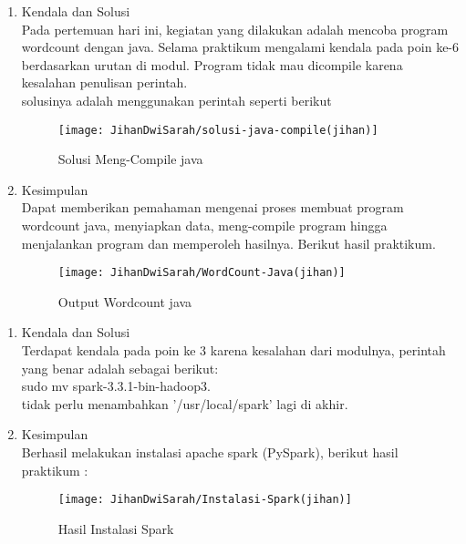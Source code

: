 \begin{enumerate}
\item Kendala dan Solusi \\
Pada pertemuan hari ini, kegiatan yang dilakukan adalah mencoba program  wordcount dengan java. Selama praktikum mengalami kendala pada poin ke-6 berdasarkan urutan di modul. Program tidak mau dicompile karena kesalahan penulisan perintah.\\

solusinya adalah menggunakan perintah seperti berikut \\
\begin{figure}[!ht]
\texttt{[image: JihanDwiSarah/solusi-java-compile(jihan)]}
\caption{Solusi Meng-Compile java}
\label{gam:solusi-java-compile(jihan)}
\end{figure}


\item Kesimpulan\\
Dapat memberikan pemahaman mengenai proses membuat program wordcount java, menyiapkan data, meng-compile program hingga menjalankan program dan memperoleh hasilnya. Berikut hasil praktikum.

\begin{figure}[!ht]
\texttt{[image: JihanDwiSarah/WordCount-Java(jihan)]}
\caption{Output Wordcount java}
\label{gam:WordCount-Java(jihan)}
\end{figure}
\end{enumerate}

\begin{enumerate}
\item Kendala dan Solusi \\
Terdapat kendala pada poin ke 3 karena kesalahan dari modulnya, perintah yang benar adalah sebagai berikut:\\
sudo mv spark-3.3.1-bin-hadoop3.\\
tidak perlu menambahkan '/usr/local/spark' lagi di akhir.


\item Kesimpulan\\
Berhasil melakukan instalasi apache spark (PySpark), berikut hasil praktikum : \\

\begin{figure}[!ht]
\texttt{[image: JihanDwiSarah/Instalasi-Spark(jihan)]}
\caption{Hasil Instalasi Spark}
\label{gam:Instalasi-Spark(jihan)}
\end{figure}


\end{enumerate}


